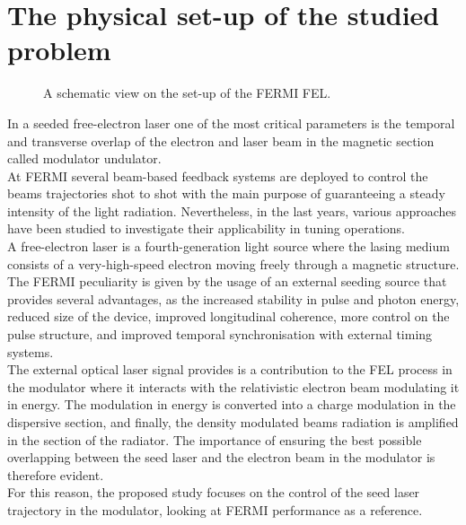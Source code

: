\documentclass[
reprint,
amsmath,amssymb,amsfonts,clevref,
aps,
prstab,
]{revtex4-2}
\begin{document}
	
	
	\section{The physical set-up of the studied problem}
	\begin{figure}[!h]
		\centering
		
		\caption{A schematic view on the set-up of the FERMI FEL.}
		\label{fig:schematic_FEL}
	\end{figure}
	In a seeded free-electron laser one of the most critical parameters is the temporal and transverse overlap of the electron and laser beam in the magnetic section called modulator undulator.\\
	At FERMI several beam-based feedback systems are deployed to control the beams trajectories shot to shot with the main purpose of guaranteeing a steady intensity of the light radiation. Nevertheless, in the last years, various approaches have been studied to investigate their applicability in tuning operations. \\
	A free-electron laser is a fourth-generation light source where the lasing medium consists of a very-high-speed electron moving freely through a magnetic structure. The FERMI peculiarity is given by the usage of an external seeding source that provides several advantages, as the increased stability in pulse and photon energy, reduced size of the device, improved longitudinal coherence, more control on the pulse structure, and improved temporal synchronisation with external timing systems.\\
	The external optical laser signal provides is a contribution to the FEL process in the modulator where it interacts with the relativistic electron beam modulating it in energy. The modulation in energy is converted into a charge modulation in the dispersive section, and finally, the density modulated beams radiation is amplified in the section of the radiator. The importance of ensuring the best possible overlapping between the seed laser and the electron beam in the modulator is therefore evident.\\
	For this reason, the proposed study focuses on the control of the seed laser trajectory in the modulator, looking at FERMI performance as a reference.
	
\end{document}
